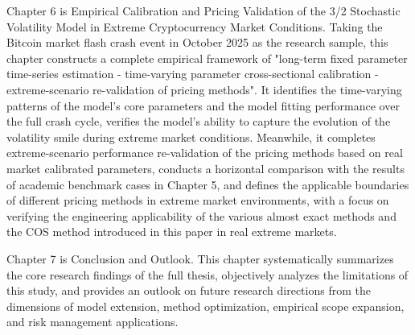 Chapter 6 is Empirical Calibration and Pricing Validation of the 3/2 Stochastic Volatility Model in Extreme Cryptocurrency Market Conditions. Taking the Bitcoin market flash crash event in October 2025 as the research sample, this chapter constructs a complete empirical framework of "long-term fixed parameter time-series estimation - time-varying parameter cross-sectional calibration - extreme-scenario re-validation of pricing methods". It identifies the time-varying patterns of the model's core parameters and the model fitting performance over the full crash cycle, verifies the model's ability to capture the evolution of the volatility smile during extreme market conditions. Meanwhile, it completes extreme-scenario performance re-validation of the pricing methods based on real market calibrated parameters, conducts a horizontal comparison with the results of academic benchmark cases in Chapter 5, and defines the applicable boundaries of different pricing methods in extreme market environments, with a focus on verifying the engineering applicability of the various almost exact methods and the COS method introduced in this paper in real extreme markets.

Chapter 7 is Conclusion and Outlook. This chapter systematically summarizes the core research findings of the full thesis, objectively analyzes the limitations of this study, and provides an outlook on future research directions from the dimensions of model extension, method optimization, empirical scope expansion, and risk management applications.